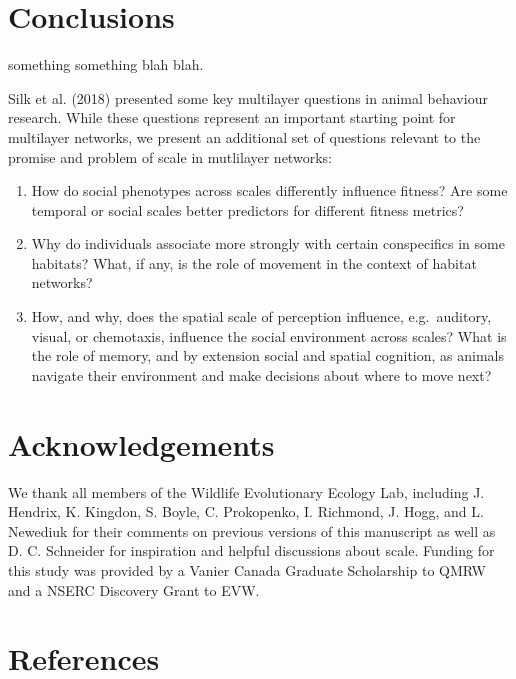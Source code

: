\documentclass[]{article}
\begin{document}
\hypertarget{conclusions}{%
\section{Conclusions}\label{conclusions}}

something something blah blah.

Silk et al. (2018) presented some key multilayer questions in animal behaviour
research. While these questions represent an important starting point for
multilayer networks, we present an additional set of questions relevant to the
promise and problem of scale in mutlilayer networks:

\begin{enumerate}
\def\labelenumi{\arabic{enumi}.}
\item
  How do social phenotypes across scales differently influence fitness? Are
  some temporal or social scales better predictors for different fitness metrics?
\item
  Why do individuals associate more strongly with certain conspecifics in some
  habitats? What, if any, is the role of movement in the context of habitat
  networks?
\item
  How, and why, does the spatial scale of perception influence, e.g.~auditory,
  visual, or chemotaxis, influence the social environment across scales? What is
  the role of memory, and by extension social and spatial cognition, as animals
  navigate their environment and make decisions about where to move next?
\end{enumerate}

\hypertarget{acknowledgements}{%
\section{Acknowledgements}\label{acknowledgements}}

We thank all members of the Wildlife Evolutionary Ecology Lab, including J. Hendrix, K.
Kingdon, S. Boyle, C. Prokopenko, I. Richmond, J. Hogg, and L. Newediuk for
their comments on previous versions of this manuscript as well as D. C. Schneider
for inspiration and helpful discussions about scale. Funding for this study was
provided by a Vanier Canada Graduate Scholarship to QMRW and a NSERC Discovery
Grant to EVW.

\hypertarget{references}{%
\section*{References}\label{references}}
\end{document}
